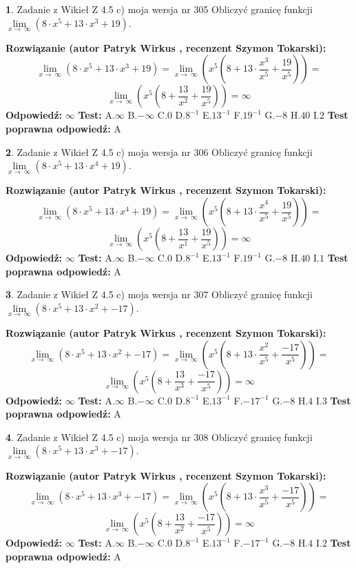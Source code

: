 \documentclass[12pt, a4paper]{article}
\theoremstyle{definition} %
\newtheorem{zad}{}
\newcommand{\zadStart}[1]{\begin{zad}#1\newline}
\newcommand{\zadStop}{\end{zad}}
\newcommand{\rozwStart}[2]{\noindent \textbf{Rozwiązanie (autor #1 , recenzent #2): }\newline}
\newcommand{\rozwStop}{\newline}
\newcommand{\odpStart}{\noindent \textbf{Odpowiedź:}\newline}
\newcommand{\odpStop}{\newline}
\newcommand{\testStart}{\noindent \textbf{Test:}\newline}
\newcommand{\testStop}{\newline}
\newcommand{\kluczStart}{\noindent \textbf{Test poprawna odpowiedź:}\newline}
\newcommand{\kluczStop}{\newline}
\begin{document}
\zadStart{Zadanie z Wikieł Z 4.5 c) moja wersja nr 305}
Obliczyć granicę funkcji  $\lim\limits_{x\to\ \infty}(8 \cdot x^{5}+13 \cdot x^{3}+19)$.
\zadStop
\rozwStart{Patryk Wirkus}{Szymon Tokarski}
$$\lim\limits_{x\to\ \infty}(8 \cdot x^{5}+13 \cdot x^{3}+19) = \lim\limits_{x\to\ \infty}(x^{5}(8 +13 \cdot \frac{x^{3}}{x^{5}}+\frac{19}{x^{5}})) =$$ $$\lim\limits_{x\to\ \infty}(x^{5}(8 +\frac{13}{x^{2}}+\frac{19}{x^{5}})) =\infty$$
\rozwStop
\odpStart
$\infty$
\odpStop
\testStart
A.$\infty$ B.$-\infty$ C.$0$ D.$8^{-1}$ E.$13^{-1}$
F.$19^{-1}$ G.$-8$
H.$40$
I.$2$
\testStop
\kluczStart
A
\kluczStop



\zadStart{Zadanie z Wikieł Z 4.5 c) moja wersja nr 306}
Obliczyć granicę funkcji  $\lim\limits_{x\to\ \infty}(8 \cdot x^{5}+13 \cdot x^{4}+19)$.
\zadStop
\rozwStart{Patryk Wirkus}{Szymon Tokarski}
$$\lim\limits_{x\to\ \infty}(8 \cdot x^{5}+13 \cdot x^{4}+19) = \lim\limits_{x\to\ \infty}(x^{5}(8 +13 \cdot \frac{x^{4}}{x^{5}}+\frac{19}{x^{5}})) =$$ $$\lim\limits_{x\to\ \infty}(x^{5}(8 +\frac{13}{x^{1}}+\frac{19}{x^{5}})) =\infty$$
\rozwStop
\odpStart
$\infty$
\odpStop
\testStart
A.$\infty$ B.$-\infty$ C.$0$ D.$8^{-1}$ E.$13^{-1}$
F.$19^{-1}$ G.$-8$
H.$40$
I.$1$
\testStop
\kluczStart
A
\kluczStop



\zadStart{Zadanie z Wikieł Z 4.5 c) moja wersja nr 307}
Obliczyć granicę funkcji  $\lim\limits_{x\to\ \infty}(8 \cdot x^{5}+13 \cdot x^{2}+-17)$.
\zadStop
\rozwStart{Patryk Wirkus}{Szymon Tokarski}
$$\lim\limits_{x\to\ \infty}(8 \cdot x^{5}+13 \cdot x^{2}+-17) = \lim\limits_{x\to\ \infty}(x^{5}(8 +13 \cdot \frac{x^{2}}{x^{5}}+\frac{-17}{x^{5}})) =$$ $$\lim\limits_{x\to\ \infty}(x^{5}(8 +\frac{13}{x^{3}}+\frac{-17}{x^{5}})) =\infty$$
\rozwStop
\odpStart
$\infty$
\odpStop
\testStart
A.$\infty$ B.$-\infty$ C.$0$ D.$8^{-1}$ E.$13^{-1}$
F.$-17^{-1}$ G.$-8$
H.$4$
I.$3$
\testStop
\kluczStart
A
\kluczStop



\zadStart{Zadanie z Wikieł Z 4.5 c) moja wersja nr 308}
Obliczyć granicę funkcji  $\lim\limits_{x\to\ \infty}(8 \cdot x^{5}+13 \cdot x^{3}+-17)$.
\zadStop
\rozwStart{Patryk Wirkus}{Szymon Tokarski}
$$\lim\limits_{x\to\ \infty}(8 \cdot x^{5}+13 \cdot x^{3}+-17) = \lim\limits_{x\to\ \infty}(x^{5}(8 +13 \cdot \frac{x^{3}}{x^{5}}+\frac{-17}{x^{5}})) =$$ $$\lim\limits_{x\to\ \infty}(x^{5}(8 +\frac{13}{x^{2}}+\frac{-17}{x^{5}})) =\infty$$
\rozwStop
\odpStart
$\infty$
\odpStop
\testStart
A.$\infty$ B.$-\infty$ C.$0$ D.$8^{-1}$ E.$13^{-1}$
F.$-17^{-1}$ G.$-8$
H.$4$
I.$2$
\testStop
\kluczStart
A
\kluczStop
\end{document}
